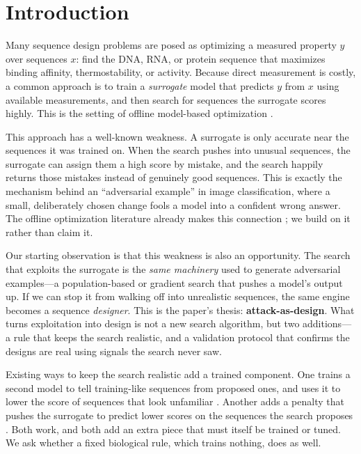 \documentclass{article}
\begin{document}
\section{Introduction}

Many sequence design problems are posed as optimizing a measured property $y$ over
sequences $x$: find the DNA, RNA, or protein sequence that maximizes binding affinity,
thermostability, or activity. Because direct measurement is costly, a common approach is to
train a \emph{surrogate} model that predicts $y$ from $x$ using available measurements, and
then search for sequences the surrogate scores highly. This is the setting of offline
model-based optimization \citep{trabucco2021coms, trabucco2022designbench}.

This approach has a well-known weakness. A surrogate is only accurate near the sequences it
was trained on. When the search pushes into unusual sequences, the surrogate can assign them
a high score by mistake, and the search happily returns those mistakes instead of genuinely
good sequences. This is exactly the mechanism behind an ``adversarial example'' in image
classification, where a small, deliberately chosen change fools a model into a confident
wrong answer. The offline optimization literature already makes this connection
\citep{trabucco2021coms, trabucco2022designbench, fu2021nemo}; we build on it rather than
claim it.

Our starting observation is that this weakness is also an opportunity. The search that
exploits the surrogate is the \emph{same machinery} used to generate adversarial examples---a
population-based or gradient search that pushes a model's output up. If we can stop it from
walking off into unrealistic sequences, the same engine becomes a sequence \emph{designer}.
This is the paper's thesis: \textbf{attack-as-design}. What turns exploitation into design is
not a new search algorithm, but two additions---a rule that keeps the search realistic, and a
validation protocol that confirms the designs are real using signals the search never saw.

Existing ways to keep the search realistic add a trained component. One trains a second model
to tell training-like sequences from proposed ones, and uses it to lower the score of
sequences that look unfamiliar \citep{yao2024gabo}. Another adds a penalty that pushes the
surrogate to predict lower scores on the sequences the search proposes
\citep{trabucco2021coms}. Both work, and both add an extra piece that must itself be trained
or tuned. We ask whether a fixed biological rule, which trains nothing, does as well.
\end{document}
